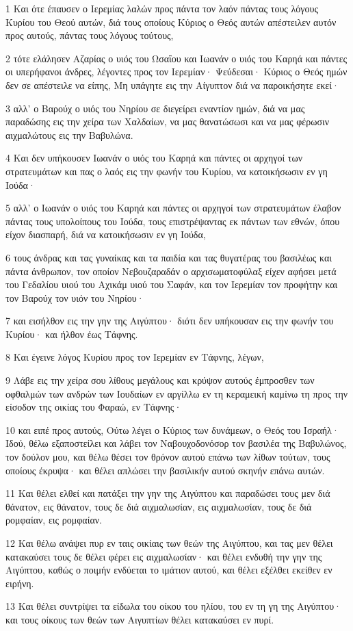 \par 1 Και ότε έπαυσεν ο Ιερεμίας λαλών προς πάντα τον λαόν πάντας τους λόγους Κυρίου του Θεού αυτών, διά τους οποίους Κύριος ο Θεός αυτών απέστειλεν αυτόν προς αυτούς, πάντας τους λόγους τούτους,
\par 2 τότε ελάλησεν Αζαρίας ο υιός του Ωσαΐου και Ιωανάν ο υιός του Καρηά και πάντες οι υπερήφανοι άνδρες, λέγοντες προς τον Ιερεμίαν· Ψεύδεσαι· Κύριος ο Θεός ημών δεν σε απέστειλε να είπης, Μη υπάγητε εις την Αίγυπτον διά να παροικήσητε εκεί·
\par 3 αλλ' ο Βαρούχ ο υιός του Νηρίου σε διεγείρει εναντίον ημών, διά να μας παραδώσης εις την χείρα των Χαλδαίων, να μας θανατώσωσι και να μας φέρωσιν αιχμαλώτους εις την Βαβυλώνα.
\par 4 Και δεν υπήκουσεν Ιωανάν ο υιός του Καρηά και πάντες οι αρχηγοί των στρατευμάτων και πας ο λαός εις την φωνήν του Κυρίου, να κατοικήσωσιν εν γη Ιούδα·
\par 5 αλλ' ο Ιωανάν ο υιός του Καρηά και πάντες οι αρχηγοί των στρατευμάτων έλαβον πάντας τους υπολοίπους του Ιούδα, τους επιστρέψαντας εκ πάντων των εθνών, όπου είχον διασπαρή, διά να κατοικήσωσιν εν γη Ιούδα,
\par 6 τους άνδρας και τας γυναίκας και τα παιδία και τας θυγατέρας του βασιλέως και πάντα άνθρωπον, τον οποίον Νεβουζαραδάν ο αρχισωματοφύλαξ είχεν αφήσει μετά του Γεδαλίου υιού του Αχικάμ υιού του Σαφάν, και τον Ιερεμίαν τον προφήτην και τον Βαρούχ τον υιόν του Νηρίου·
\par 7 και εισήλθον εις την γην της Αιγύπτου· διότι δεν υπήκουσαν εις την φωνήν του Κυρίου· και ήλθον έως Τάφνης.
\par 8 Και έγεινε λόγος Κυρίου προς τον Ιερεμίαν εν Τάφνης, λέγων,
\par 9 Λάβε εις την χείρα σου λίθους μεγάλους και κρύψον αυτούς έμπροσθεν των οφθαλμών των ανδρών των Ιουδαίων εν αργίλλω εν τη κεραμεική καμίνω τη προς την είσοδον της οικίας του Φαραώ, εν Τάφνης·
\par 10 και ειπέ προς αυτούς, Ούτω λέγει ο Κύριος των δυνάμεων, ο Θεός του Ισραήλ· Ιδού, θέλω εξαποστείλει και λάβει τον Ναβουχοδονόσορ τον βασιλέα της Βαβυλώνος, τον δούλον μου, και θέλω θέσει τον θρόνον αυτού επάνω των λίθων τούτων, τους οποίους έκρυψα· και θέλει απλώσει την βασιλικήν αυτού σκηνήν επάνω αυτών.
\par 11 Και θέλει ελθεί και πατάξει την γην της Αιγύπτου και παραδώσει τους μεν διά θάνατον, εις θάνατον, τους δε διά αιχμαλωσίαν, εις αιχμαλωσίαν, τους δε διά ρομφαίαν, εις ρομφαίαν.
\par 12 Και θέλω ανάψει πυρ εν ταις οικίαις των θεών της Αιγύπτου, και τας μεν θέλει κατακαύσει τους δε θέλει φέρει εις αιχμαλωσίαν· και θέλει ενδυθή την γην της Αιγύπτου, καθώς ο ποιμήν ενδύεται το ιμάτιον αυτού, και θέλει εξέλθει εκείθεν εν ειρήνη.
\par 13 Και θέλει συντρίψει τα είδωλα του οίκου του ηλίου, του εν τη γη της Αιγύπτου· και τους οίκους των θεών των Αιγυπτίων θέλει κατακαύσει εν πυρί.


